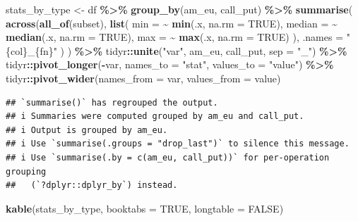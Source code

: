 \documentclass[
]{article}
\newenvironment{Shaded}{\begin{snugshade}}{\end{snugshade}}
\newcommand{\AttributeTok}[1]{\textcolor[rgb]{0.13,0.29,0.53}{#1}}
\newcommand{\ConstantTok}[1]{\textcolor[rgb]{0.56,0.35,0.01}{#1}}
\newcommand{\FunctionTok}[1]{\textcolor[rgb]{0.13,0.29,0.53}{\textbf{#1}}}
\newcommand{\NormalTok}[1]{#1}
\newcommand{\OtherTok}[1]{\textcolor[rgb]{0.56,0.35,0.01}{#1}}
\newcommand{\SpecialCharTok}[1]{\textcolor[rgb]{0.81,0.36,0.00}{\textbf{#1}}}
\newcommand{\StringTok}[1]{\textcolor[rgb]{0.31,0.60,0.02}{#1}}
\begin{document}
\begin{Shaded}
\begin{Highlighting}[]
\NormalTok{stats\_by\_type }\OtherTok{\textless{}{-}}\NormalTok{ df }\SpecialCharTok{\%\textgreater{}\%}
  \FunctionTok{group\_by}\NormalTok{(am\_eu, call\_put) }\SpecialCharTok{\%\textgreater{}\%}
  \FunctionTok{summarise}\NormalTok{(}
    \FunctionTok{across}\NormalTok{(}\FunctionTok{all\_of}\NormalTok{(subset),}
      \FunctionTok{list}\NormalTok{(}
        \AttributeTok{min =} \SpecialCharTok{\textasciitilde{}} \FunctionTok{min}\NormalTok{(.x, }\AttributeTok{na.rm =} \ConstantTok{TRUE}\NormalTok{),}
        \AttributeTok{median =} \SpecialCharTok{\textasciitilde{}} \FunctionTok{median}\NormalTok{(.x, }\AttributeTok{na.rm =} \ConstantTok{TRUE}\NormalTok{),}
        \AttributeTok{max =} \SpecialCharTok{\textasciitilde{}} \FunctionTok{max}\NormalTok{(.x, }\AttributeTok{na.rm =} \ConstantTok{TRUE}\NormalTok{)}
\NormalTok{      ),}
      \AttributeTok{.names =} \StringTok{"\{col\}\_\{fn\}"}
\NormalTok{    )}
\NormalTok{  ) }\SpecialCharTok{\%\textgreater{}\%}
\NormalTok{  tidyr}\SpecialCharTok{::}\FunctionTok{unite}\NormalTok{(}\StringTok{"var"}\NormalTok{, am\_eu, call\_put, }\AttributeTok{sep =} \StringTok{"\_"}\NormalTok{) }\SpecialCharTok{\%\textgreater{}\%}
\NormalTok{  tidyr}\SpecialCharTok{::}\FunctionTok{pivot\_longer}\NormalTok{(}\SpecialCharTok{{-}}\NormalTok{var, }\AttributeTok{names\_to =} \StringTok{"stat"}\NormalTok{, }\AttributeTok{values\_to =} \StringTok{"value"}\NormalTok{) }\SpecialCharTok{\%\textgreater{}\%}
\NormalTok{  tidyr}\SpecialCharTok{::}\FunctionTok{pivot\_wider}\NormalTok{(}\AttributeTok{names\_from =}\NormalTok{ var, }\AttributeTok{values\_from =}\NormalTok{ value)}
\end{Highlighting}
\end{Shaded}

\begin{verbatim}
## `summarise()` has regrouped the output.
## i Summaries were computed grouped by am_eu and call_put.
## i Output is grouped by am_eu.
## i Use `summarise(.groups = "drop_last")` to silence this message.
## i Use `summarise(.by = c(am_eu, call_put))` for per-operation grouping
##   (`?dplyr::dplyr_by`) instead.
\end{verbatim}

\begin{Shaded}
\begin{Highlighting}[]
\FunctionTok{kable}\NormalTok{(stats\_by\_type, }\AttributeTok{booktabs =} \ConstantTok{TRUE}\NormalTok{, }\AttributeTok{longtable =} \ConstantTok{FALSE}\NormalTok{)}
\end{Highlighting}
\end{Shaded}
\end{document}
